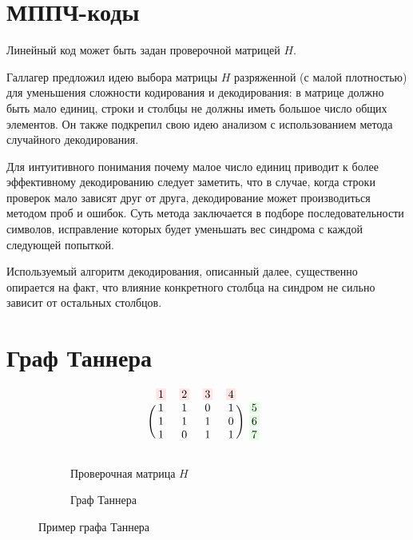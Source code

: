 \section{МППЧ-коды}

Линейный код может быть задан проверочной матрицей $H$.

Галлагер \cite{gallager} предложил идею выбора матрицы $H$ разряженной (с малой плотностью) для уменьшения
 сложности кодирования и декодирования: в матрице должно быть мало единиц, строки и столбцы не должны 
 иметь большое число  общих элементов. Он также подкрепил свою идею анализом с использованием 
 метода случайного декодирования.
 
 Для интуитивного понимания почему малое число единиц приводит к более эффективному декодированию следует
 заметить, что в случае, когда строки проверок мало зависят друг от друга, декодирование может производиться 
 методом проб и ошибок. Суть метода заключается в подборе последовательности символов, исправление которых будет уменьшать
 вес синдрома с каждой следующей попыткой.
 
 Используемый алгоритм декодирования, описанный далее, существенно опирается на факт, что влияние конкретного
 столбца на синдром не сильно зависит от остальных столбцов.
 



\section{Граф Таннера}

\newcommand\colorBox[2]{\setlength{\fboxsep}{2pt}\colorbox{#1!10}{#2}}

\begin{figure}[h!]
\centering
\begin{subfigure}{.3\textwidth}
  \centering
  \[
    \begin{blockarray}{ccccc}
        \colorBox{red}{1} & \colorBox{red}{2} & \colorBox{red}{3} & \colorBox{red}{4} \\
        \begin{block}{(cccc)c}
            1&1&0&1&\colorBox{green}{5}\\
            1&1&1&0&\colorBox{green}{6}\\
            1&0&1&1&\colorBox{green}{7} \\
        \end{block}
    \end{blockarray}
  \]
  \caption{Проверочная матрица $H$}
  \label{checkMatrix}
\end{subfigure}%
\begin{subfigure}{.7\textwidth}
  \centering
  \caption{Граф Таннера}
  \label{checkMatrix}
\end{subfigure}
\caption{Пример графа Таннера}
\end{figure}

